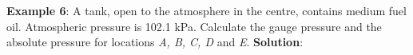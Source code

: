 \documentclass[10pt]{amsart}
\begin{document}
\begin{minipage}[t]{0.45\textwidth}
 \raggedright
 \textbf{Example 6}:
 A tank, open to the atmosphere in the centre, contains medium fuel
 oil. Atmospheric pressure is 102.1 kPa. Calculate the gauge pressure
 and the absolute pressure for locations \emph{A, B, C, D} and \emph{E}.
 \parb
 \textbf{Solution}:
 \parb
 

\end{minipage}
\end{document}
